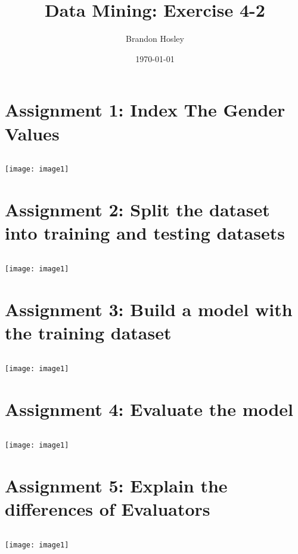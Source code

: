 \documentclass[]{article}
\title{Data Mining: Exercise 4-2}
\author{Brandon Hosley}
\date{\today}
\begin{document}
\maketitle

\section*{Assignment 1: Index The Gender Values}

\begin{verbatim}

\end{verbatim}
\texttt{[image: image1]}


\section*{Assignment 2: Split the dataset into training and testing datasets}

\begin{verbatim}

\end{verbatim}
\texttt{[image: image1]}


\section*{Assignment 3: Build a model with the training dataset}

\begin{verbatim}

\end{verbatim}
\texttt{[image: image1]}


\section*{Assignment 4: Evaluate the model}

\begin{verbatim}

\end{verbatim}
\texttt{[image: image1]}


\section*{Assignment 5: Explain the differences of Evaluators}

\begin{verbatim}

\end{verbatim}
\texttt{[image: image1]}
\end{document}
